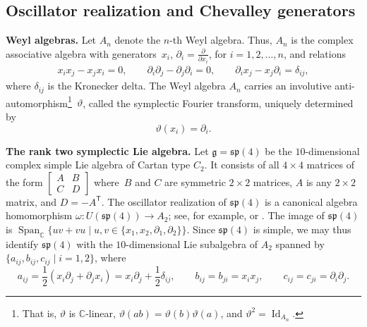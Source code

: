 \documentclass[10pt,a4paper]{amsart}
\numberwithin{equation}{section}
\DeclareMathOperator{\Id}{Id}
\DeclareMathOperator{\Span}{Span}
\begin{document}
\subsection{Oscillator realization and Chevalley generators}\label{subsec:Oscillator-Chevalley}

{\bf Weyl algebras.}
Let $A_{n}$ denote the $n$-th Weyl algebra. Thus, $A_{n}$ is the complex associative algebra with generators~$x_{i}$, $\partial_{i} = \frac{\partial}{\partial x_{i}}$, for $i=1,2,\dots,n$, and relations
\begin{align}\label{eq:weylrels}
	x_ix_j-x_ jx_i =0,\qquad
	\partial_i\partial_j-\partial_j\partial_i =0,\qquad
	\partial_ix_j-x_j\partial_i =\delta_{ij},
\end{align}
where $\delta_{ij}$ is the Kronecker delta. The Weyl algebra $A_{n}$ carries an involutive anti-automor\-phism\footnote{That is, $\vartheta$ is $\mathbb{C}$-linear, $\vartheta(ab)=\vartheta(b)\vartheta(a)$, and $\vartheta^2=\Id_{A_n}$.}~$\vartheta$, called the symplectic Fourier transform, uniquely determined by
\begin{equation}\label{eq:vartheta}
	\vartheta(x_{i})=\partial_{i}.
\end{equation}

{\bf The rank two symplectic Lie algebra.}
Let $\mathfrak{g}=\mathfrak{sp}(4)$ be the $10$-dimensional complex simple Lie algebra of Cartan type $C_2$. It consists of all $4\times 4$ matrices of the form $\left[\begin{smallmatrix}A&B\\C&D\end{smallmatrix}\right]$ where~$B$ and $C$ are symmetric $2\times 2$ matrices, $A$ is any $2\times 2$ matrix, and $D=-A^{\mathsf{T}}$.
The oscillator realization of $\mathfrak{sp}(4)$ is a canonical algebra homomorphism $\omega\colon U(\mathfrak{sp}(4))\to A_2$; see, for example, \cite[Section~4.6]{dixmierEnvelopingAlgebras1996} or \cite{havlicekCanonicalRealizationsLie1976}.
The image of $\mathfrak{sp}(4)$ is $\Span_\mathbb{C}\{uv+vu\mid u,v\in\{x_1,x_2,\partial_1,\partial_2\}\}$.
Since $\mathfrak{sp}(4)$ is simple, we may thus identify $\mathfrak{sp}(4)$ with the $10$-dimensional Lie subalgebra of $A_{2}$ spanned by $\{a_{ij}, b_{ij}, c_{ij} \mid i = 1,2\}$, where
\begin{equation}\label{eq:sp4-oscillator}
	a_{ij} = \frac{1}{2}(x_i\partial_j+\partial_jx_i)=x_i\partial_j+\frac{1}{2}\delta_{ij},\qquad
	b_{ij} = b_{ji} = x_ix_j,\qquad
	c_{ij} = c_{ji} = \partial_i\partial_j.
\end{equation}
\end{document}
